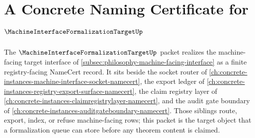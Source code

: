 \chapter{A Concrete Naming Certificate for $\MachineInterfaceFormalizationTargetUp$}
\label{ch:concrete-instances-machine-interface-formalization-target-namecert}

The $\MachineInterfaceFormalizationTargetUp$ packet realizes the machine-facing target interface of \autoref{subsec:philosophy-machine-facing-interface} as a finite registry-facing NameCert record. It sits beside the socket router of \autoref{ch:concrete-instances-machine-interface-socket-namecert}, the export ledger of \autoref{ch:concrete-instances-registry-export-surface-namecert}, the claim registry layer of \autoref{ch:concrete-instances-claimregistrylayer-namecert}, and the audit gate boundary of \autoref{ch:concrete-instances-auditgateboundary-namecert}. Those siblings route, export, index, or refuse machine-facing rows; this packet is the target object that a formalization queue can store before any theorem content is claimed.

